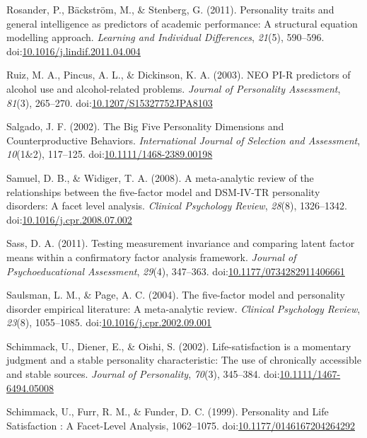 \documentclass[,man,floatsintext]{apa6}
\begin{document}
\hypertarget{ref-Rosander2011}{}
Rosander, P., Bäckström, M., \& Stenberg, G. (2011). Personality traits
and general intelligence as predictors of academic performance: A
structural equation modelling approach. \emph{Learning and Individual
Differences}, \emph{21}(5), 590--596.
doi:\href{https://doi.org/10.1016/j.lindif.2011.04.004}{10.1016/j.lindif.2011.04.004}

\hypertarget{ref-Ruiz2003}{}
Ruiz, M. A., Pincus, A. L., \& Dickinson, K. A. (2003). NEO PI-R
predictors of alcohol use and alcohol-related problems. \emph{Journal of
Personality Assessment}, \emph{81}(3), 265--270.
doi:\href{https://doi.org/10.1207/S15327752JPA8103}{10.1207/S15327752JPA8103}

\hypertarget{ref-Salgado2002}{}
Salgado, J. F. (2002). The Big Five Personality Dimensions and
Counterproductive Behaviors. \emph{International Journal of Selection
and Assessment}, \emph{10}(1\&2), 117--125.
doi:\href{https://doi.org/10.1111/1468-2389.00198}{10.1111/1468-2389.00198}

\hypertarget{ref-SamuelWidiger2008}{}
Samuel, D. B., \& Widiger, T. A. (2008). A meta-analytic review of the
relationships between the five-factor model and DSM-IV-TR personality
disorders: A facet level analysis. \emph{Clinical Psychology Review},
\emph{28}(8), 1326--1342.
doi:\href{https://doi.org/10.1016/j.cpr.2008.07.002}{10.1016/j.cpr.2008.07.002}

\hypertarget{ref-Sass2011}{}
Sass, D. A. (2011). Testing measurement invariance and comparing latent
factor means within a confirmatory factor analysis framework.
\emph{Journal of Psychoeducational Assessment}, \emph{29}(4), 347--363.
doi:\href{https://doi.org/10.1177/0734282911406661}{10.1177/0734282911406661}

\hypertarget{ref-SaulsmanPage2004}{}
Saulsman, L. M., \& Page, A. C. (2004). The five-factor model and
personality disorder empirical literature: A meta-analytic review.
\emph{Clinical Psychology Review}, \emph{23}(8), 1055--1085.
doi:\href{https://doi.org/10.1016/j.cpr.2002.09.001}{10.1016/j.cpr.2002.09.001}

\hypertarget{ref-Schimmack2002}{}
Schimmack, U., Diener, E., \& Oishi, S. (2002). Life-satisfaction is a
momentary judgment and a stable personality characteristic: The use of
chronically accessible and stable sources. \emph{Journal of
Personality}, \emph{70}(3), 345--384.
doi:\href{https://doi.org/10.1111/1467-6494.05008}{10.1111/1467-6494.05008}

\hypertarget{ref-Schimmack1999}{}
Schimmack, U., Furr, R. M., \& Funder, D. C. (1999). Personality and
Life Satisfaction : A Facet-Level Analysis, 1062--1075.
doi:\href{https://doi.org/10.1177/0146167204264292}{10.1177/0146167204264292}
\end{document}
